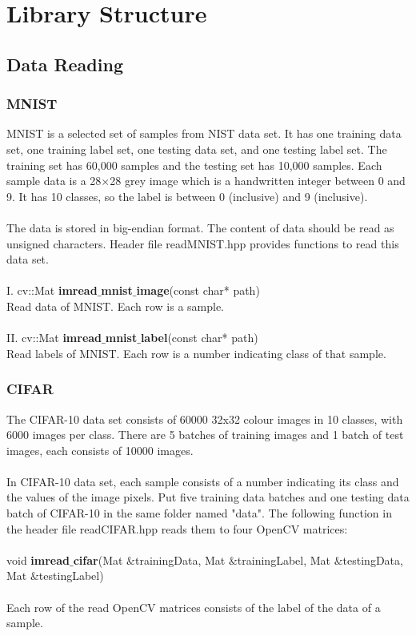 \documentclass[12pt]{article}
\begin{document}
\section{Library Structure}
\subsection{Data Reading}
\subsubsection{MNIST}
MNIST is a selected set of samples from NIST data set. It has one training data set, one training label set, one testing data set, and one testing label set. The training set has 60,000 samples and the testing set has 10,000 samples. Each sample data is a 28$\times$28 grey image which is a handwritten integer between 0 and 9. It has 10 classes, so the label is between 0 (inclusive) and 9 (inclusive).\\
\\
The data is stored in big-endian format. The content of data should be read as unsigned characters. Header file readMNIST.hpp provides functions to read this data set.\\
\\
I. cv::Mat \textbf{imread$\_$mnist$\_$image}(const char* path)\\
Read data of MNIST. Each row is a sample.\\
\\
II. cv::Mat \textbf{imread$\_$mnist$\_$label}(const char* path)\\
Read labels of MNIST. Each row is a number indicating class of that sample.
\subsubsection{CIFAR}
The CIFAR-10 data set consists of 60000 32x32 colour images in 10 classes, with 6000 images per class. There are 5 batches of training images and 1 batch of test images, each consists of 10000 images.\\
\\
In CIFAR-10 data set, each sample consists of a number indicating its class and the values of the image pixels. Put five training data batches and one testing data batch of CIFAR-10 in the same folder named "data". The following function in the header file readCIFAR.hpp reads them to four OpenCV matrices:\\
\\
void \textbf{imread$\_$cifar}(Mat $\&$trainingData, Mat $\&$trainingLabel, Mat $\&$testingData, Mat $\&$testingLabel)\\
\\
Each row of the read OpenCV matrices consists of the label of the data of a sample.
\end{document}
